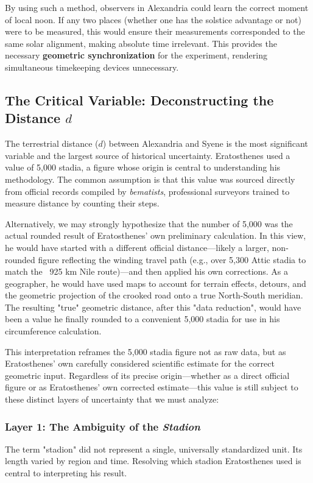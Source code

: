 \documentclass[11pt]{article}
\begin{document}
By using such a method, observers in Alexandria could learn the correct moment of local noon. If any two places (whether one has the solstice advantage or not) were to be measured, this would ensure their measurements corresponded to the same solar alignment, making absolute time irrelevant. This provides the necessary \textbf{geometric synchronization} for the experiment, rendering simultaneous timekeeping devices unnecessary.

\subsection{The Critical Variable: Deconstructing the Distance \texorpdfstring{$d$}{d}}

The terrestrial distance ($d$) between Alexandria and Syene is the most significant variable and the largest source of historical uncertainty. Eratosthenes used a value of 5,000 stadia, a figure whose origin is central to understanding his methodology. The common assumption is that this value was sourced directly from official records compiled by \textit{bematists}, professional surveyors trained to measure distance by counting their steps.

Alternatively, we may strongly hypothesize that the number of 5,000 was the actual rounded result of Eratosthenes' own preliminary calculation. In this view, he would have started with a different official distance—likely a larger, non-rounded figure reflecting the winding travel path (e.g., over 5,300 Attic stadia to match the ~925 km Nile route)—and then applied his own corrections. As a geographer, he would have used maps to account for terrain effects, detours, and the geometric projection of the crooked road onto a true North-South meridian. The resulting "true" geometric distance, after this "data reduction", would have been a value he finally rounded to a convenient 5,000 stadia for use in his circumference calculation.

This interpretation reframes the 5,000 stadia figure not as raw data, but as Eratosthenes' own carefully considered scientific estimate for the correct geometric input. Regardless of its precise origin—whether as a direct official figure or as Eratosthenes' own corrected estimate—this value is still subject to these distinct layers of uncertainty that we must analyze:


\subsubsection{Layer 1: The Ambiguity of the \textit{Stadion}}
The term "stadion" did not represent a single, universally standardized unit. Its length varied by region and time. Resolving which stadion Eratosthenes used is central to interpreting his result.
\end{document}
